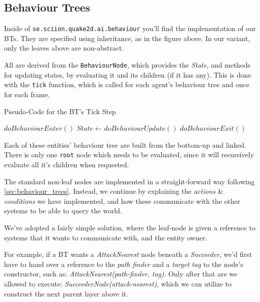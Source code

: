 \documentclass[a4paper, twocolumn]{article}
\begin{document}
        \subsection{Behaviour Trees} \label{sec:behaviour_trees_implementation}

        Inside of \texttt{se.sciion.quake2d.ai.behaviour} you'll find the implementation of our BTs. They are specified using inheritance, as in the figure above. In our variant, only the leaves above are non-abstract.

        All are derived from the \texttt{BehaviourNode}, which provides the \emph{State}, and methods for updating states, by evaluating it and its children (if it has any). This is done with the \texttt{tick} function, which is called for each agent's behaviour tree and once for each frame.

        \begin{algorithm}[H]
            \caption{Pseudo-Code for the BT's Tick Step}
            \label{alg:behaviour_tree_update}
            \begin{algorithmic}
                    \STATE \(doBehaviourEnter()\)
                \ENDIF
                \STATE \(State \leftarrow doBehaviourUpdate()\)
                    \STATE \(doBehaviourExit()\)
                \ENDIF
            \end{algorithmic}
        \end{algorithm}

        Each of these entities' behaviour tree are built from the bottom-up and linked. There is only one \texttt{root} node which needs to be evaluated, since it will recursively evaluate all it's children when requested.

        The standard non-leaf nodes are implemented in a straight-forward way following \cref{sec:behaviour_trees}. Instead, we continue by explaining the \emph{actions} \& \emph{conditions} we have implemented, and how these communicate with the other systems to be able to query the world.

        We've adopted a fairly simple solution, where the leaf-node is given a reference to systems that it wants to communicate with, and the entity owner.

        For example, if a BT wants a \emph{AttackNearest} node beneath a \emph{Succeeder}, we'd first have to hand over a reference to the \emph{path finder} and a \emph{target tag} to the node's constructor, such as: \emph{AttackNearest(path-finder, tag)}. Only after that are we allowed to execute: \emph{SucceederNode(attack-nearest)}, which we can utilize to construct the next parent layer above it.
\end{document}
